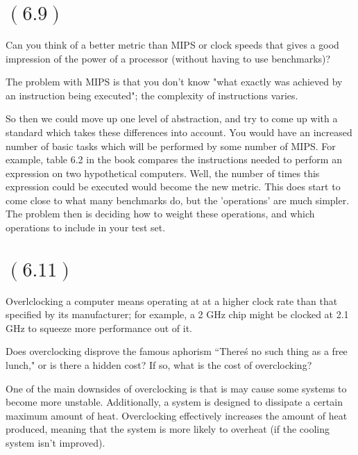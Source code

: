 \documentclass[letterpaper,12pt,titlepage]{article}
\begin{document}
\section*{$(6.9)$} Can you think of a better metric than MIPS or clock speeds that gives a good impression of the power of a processor (without having to use benchmarks)?
\begin{mdframed}[style=MyFrame]

The problem with MIPS is that you don't know "what exactly was achieved by an instruction being executed";
\cite{Clements} the complexity of instructions varies.

So then we could move up one level of abstraction, and try to come up with a standard which takes these differences into account. You would have an increased number of basic tasks which will be performed by some number of MIPS. For example, table 6.2 in the book compares the instructions needed to perform an expression on two hypothetical computers. Well, the number of times this expression could be executed would become the new metric. This does start to come close to what many benchmarks do, but the 'operations' are much simpler. The problem then is deciding how to weight these operations, and which operations to include in your test set.

\end{mdframed}

\section*{$(6.11)$} Overlclocking a computer means operating at at a higher clock rate than that specified by its manufacturer; for example, a 2 GHz chip might be clocked at 2.1 GHz to squeeze more performance out of it.

Does overclocking disprove the famous aphorism ``There\'s no such thing as a free lunch," or is there a hidden cost? If so, what is the cost of overclocking?

\begin{mdframed}[style=MyFrame]

One of the main downsides of overclocking is that is may cause some systems to become more unstable. Additionally, a system is designed to dissipate a certain maximum amount of heat. Overclocking effectively increases the amount of heat produced, meaning that the system is more likely to overheat (if the cooling system isn't improved).

\end{mdframed}
\newpage
\end{document}
